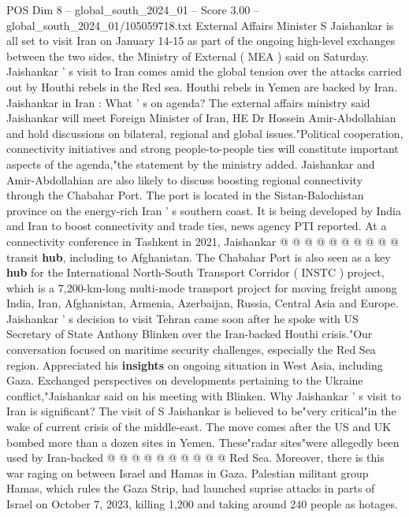 \begin{textsample}{POS Dim 8 – global\_south\_2024\_01 – Score 3.00 – global\_south\_2024\_01/105059718.txt}  \label{ex:f8_pos_397}
External Affairs Minister S Jaishankar is all set to visit Iran on January 14-15 as part of the ongoing high-level exchanges between the two sides, the Ministry of External ( MEA ) said on Saturday.
Jaishankar ' s visit to Iran comes amid the global tension over the attacks carried out by Houthi rebels in the Red sea.
Houthi rebels in Yemen are backed by Iran.
Jaishankar in Iran : What ' s on agenda?
The external affairs ministry said Jaishankar will meet Foreign Minister of Iran, HE Dr Hossein Amir-Abdollahian and hold discussions on bilateral, regional and global issues."Political cooperation, connectivity initiatives and strong people-to-people ties will constitute important aspects of the agenda,"the statement by the ministry added.
Jaishankar and Amir-Abdollahian are also likely to discuss boosting regional connectivity through the Chabahar Port.
The port is located in the Sistan-Balochistan province on the energy-rich Iran ' s southern coast.
It is being developed by India and Iran to boost connectivity and trade ties, news agency PTI reported.
At a connectivity conference in Tashkent in 2021, Jaishankar @ @ @ @ @ @ @ @ @ @ transit \textbf{hub}, including to Afghanistan.
The Chabahar Port is also seen as a key \textbf{hub} for the International North-South Transport Corridor ( INSTC ) project, which is a 7,200-km-long multi-mode transport project for moving freight among India, Iran, Afghanistan, Armenia, Azerbaijan, Russia, Central Asia and Europe.
Jaishankar ' s decision to visit Tehran came soon after he spoke with US Secretary of State Anthony Blinken over the Iran-backed Houthi crisis."Our conversation focused on maritime security challenges, especially the Red Sea region.
Appreciated his \textbf{insights} on ongoing situation in West Asia, including Gaza.
Exchanged perspectives on developments pertaining to the Ukraine conflict,"Jaishankar said on his meeting with Blinken.
Why Jaishankar ' s visit to Iran is significant?
The visit of S Jaishankar is believed to be"very critical"in the wake of current crisis of the middle-east.
The move comes after the US and UK bombed more than a dozen sites in Yemen.
These"radar sites"were allegedly been used by Iran-backed @ @ @ @ @ @ @ @ @ @ Red Sea.
Moreover, there is this war raging on between Israel and Hamas in Gaza.
Palestian militant group Hamas, which rules the Gaza Strip, had launched suprise attacks in parts of Israel on October 7, 2023, killing 1,200 and taking around 240 people as hotages.

\end{textsample}
